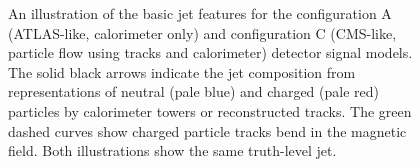 \documentclass[11pt,letterpaper]{article}
\newcommand{\GeV}{\text{GeV}}
\newcommand{\ccalo}{\ensuremath{c_{\text{calo}}}}
\newcommand{\atrk}{\ensuremath{a_{\text{track}}}}
\newcommand{\ctrk}{\ensuremath{c_{\text{track}}}}
\begin{document}



\begin{figure}
\begin{center}
\end{center}
\caption{An illustration of the basic jet features for the configuration A (ATLAS-like, calorimeter only) and configuration C (CMS-like, particle flow using tracks and calorimeter) detector signal models. The solid black arrows indicate the jet composition from representations of neutral (pale blue) and charged (pale red) particles by calorimeter towers or reconstructed tracks. The green dashed curves show charged particle tracks bend in the magnetic field. Both illustrations show the same truth-level jet.}
\label{fig:detmodel}
\end{figure}
\end{document}
